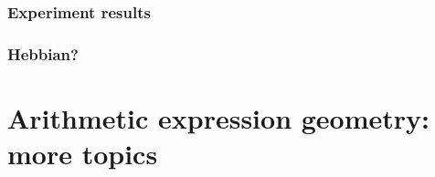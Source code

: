 \documentclass[aspectratio=169]{beamer}
\begin{document}
\begin{frame}
\frametitle{Experiment results}
\begin{figure}[ht]\centering
{}
\end{figure}
\end{frame}

\begin{frame}
\frametitle{Hebbian?}
\begin{figure}[ht]\centering
{}
\end{figure}
\end{frame}

\section{Arithmetic expression geometry: more topics}
\end{document}
